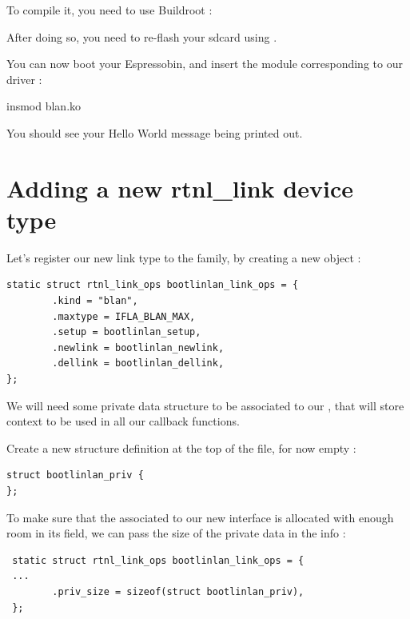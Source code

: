 To compile it, you need to use Buildroot :

After doing so, you need to re-flash your sdcard using .
 
You can now boot your Espressobin, and insert the module corresponding to our driver :
 
\begin{targetbashinput}
insmod blan.ko
\end{targetbashinput}
 
 You should see your Hello World message being printed out.
 
 \section{Adding a new rtnl\_link device type}
 
 Let's register our new link type to the  family, by creating a
 new  object :
 
\begin{verbatim}
static struct rtnl_link_ops bootlinlan_link_ops = {
        .kind = "blan",
        .maxtype = IFLA_BLAN_MAX,
        .setup = bootlinlan_setup,
        .newlink = bootlinlan_newlink,
        .dellink = bootlinlan_dellink,
};
\end{verbatim}

 We will need some private data structure to be associated to our , that will store context to be used in all our callback functions.

 Create a new structure definition at the top of the file, for now empty :

\begin{verbatim}
struct bootlinlan_priv {
};
\end{verbatim}

To make sure that the  associated to our new interface is allocated with enough
room in its  field, we can pass the size of the private data in the  info :

 \begin{verbatim}
 static struct rtnl_link_ops bootlinlan_link_ops = {
 ...
        .priv_size = sizeof(struct bootlinlan_priv),
 };
 \end{verbatim}
 
